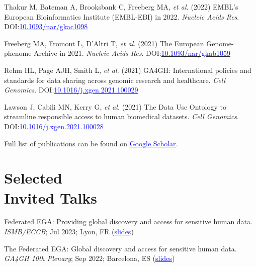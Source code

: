 \documentclass[margin,line]{res}
\begin{document}
\begin{resume}
Thakur M, Bateman A, Brooksbank C, Freeberg MA, {\em et al.} (2022) EMBL's European Bioinformatics Institute (EMBL-EBI) in 2022. {\em Nucleic Acids Res}. DOI:\href{https://doi.org/10.1093/nar/gkac1098}{\textcolor{blue}{10.1093/nar/gkac1098}}

Freeberg MA, Fromont L, D'Altri T, {\em et al.} (2021) The European Genome-phenome Archive in 2021. {\em Nucleic Acids Res}. DOI:\href{https://doi.org/10.1093/nar/gkab1059}{\textcolor{blue}{10.1093/nar/gkab1059}}

Rehm HL, Page AJH, Smith L, {\em et al.} (2021) GA4GH: International policies and standards for data sharing across genomic research and healthcare. {\em Cell Genomics}. DOI:\href{https://doi.org/10.1016/j.xgen.2021.100029}{\textcolor{blue}{10.1016/j.xgen.2021.100029}}

Lawson J, Cabili MN, Kerry G, {\em et al.} (2021) The Data Use Ontology to streamline responsible access to human biomedical datasets. {\em Cell Genomics}. DOI:\href{https://doi.org/10.1016/j.xgen.2021.100028}{\textcolor{blue}{10.1016/j.xgen.2021.100028}}


\Rightarrow  Full list of publications can be found on \href{https://scholar.google.com/citations?user=2LCcJA0AAAAJ&hl=en}{\textcolor{blue}{Google Scholar}}.

\section{\sc Selected\\ Invited Talks}

Federated EGA: Providing global discovery and access for sensitive human data. {\em ISMB/ECCB}; Jul 2023; Lyon, FR (\href{https://docs.google.com/presentation/d/1P9KMd-NAjbz1f9fgO9FVuyYTVAoYZoJAqL0wvnVNrt4/edit?usp=sharing}{\textcolor{blue}{slides}})

The Federated EGA: Global discovery and access for sensitive human data. {\em GA4GH 10th Plenary}; Sep 2022; Barcelona, ES (\href{https://docs.google.com/presentation/d/17wJu5ntPdT1Uj3kSOd_ROHY0DK7IzRwRq6Lgyvso2aw/edit?usp=sharing}{\textcolor{blue}{slides}})


\end{resume}
\end{document}
